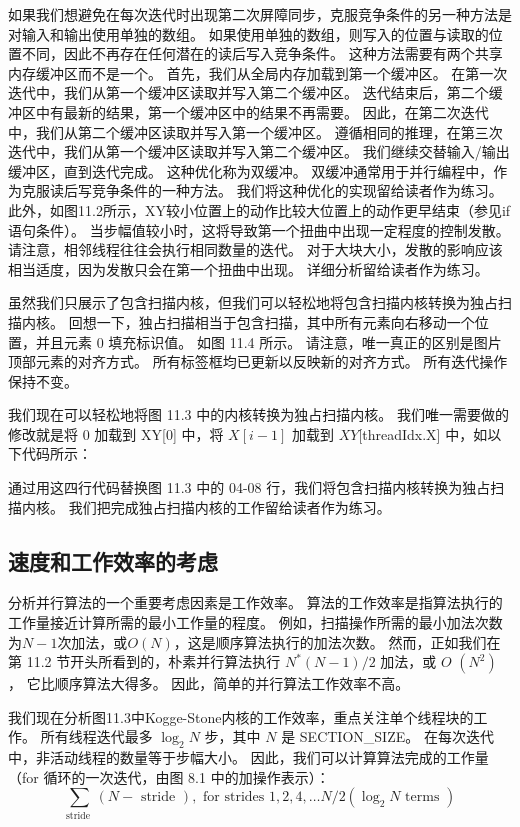 如果我们想避免在每次迭代时出现第二次屏障同步，克服竞争条件的另一种方法是对输入和输出使用单独的数组。 
如果使用单独的数组，则写入的位置与读取的位置不同，因此不再存在任何潜在的读后写入竞争条件。 
这种方法需要有两个共享内存缓冲区而不是一个。 首先，我们从全局内存加载到第一个缓冲区。 
在第一次迭代中，我们从第一个缓冲区读取并写入第二个缓冲区。 
迭代结束后，第二个缓冲区中有最新的结果，第一个缓冲区中的结果不再需要。 
因此，在第二次迭代中，我们从第二个缓冲区读取并写入第一个缓冲区。 
遵循相同的推理，在第三次迭代中，我们从第一个缓冲区读取并写入第二个缓冲区。 我们继续交替输入/输出缓冲区，直到迭代完成。 
这种优化称为双缓冲。 双缓冲通常用于并行编程中，作为克服读后写竞争条件的一种方法。 我们将这种优化的实现留给读者作为练习。 
此外，如图11.2所示，$\mathrm{XY}$较小位置上的动作比较大位置上的动作更早结束（参见if语句条件）。 
当步幅值较小时，这将导致第一个扭曲中出现一定程度的控制发散。 请注意，相邻线程往往会执行相同数量的迭代。 
对于大块大小，发散的影响应该相当适度，因为发散只会在第一个扭曲中出现。 详细分析留给读者作为练习。

虽然我们只展示了包含扫描内核，但我们可以轻松地将包含扫描内核转换为独占扫描内核。 
回想一下，独占扫描相当于包含扫描，其中所有元素向右移动一个位置，并且元素 0 填充标识值。 如图 11.4 所示。 
请注意，唯一真正的区别是图片顶部元素的对齐方式。 所有标签框均已更新以反映新的对齐方式。 所有迭代操作保持不变。

我们现在可以轻松地将图 11.3 中的内核转换为独占扫描内核。 
我们唯一需要做的修改就是将 0 加载到 XY[0] 中，将 $X[i-1]$ 加载到 $XY[$threadIdx.X] 中，如以下代码所示：

通过用这四行代码替换图 11.3 中的 04-08 行，我们将包含扫描内核转换为独占扫描内核。 
我们把完成独占扫描内核的工作留给读者作为练习。

\subsection{速度和工作效率的考虑}
分析并行算法的一个重要考虑因素是工作效率。 算法的工作效率是指算法执行的工作量接近计算所需的最小工作量的程度。 
例如，扫描操作所需的最小加法次数为$N-1$次加法，或$O(N)$，这是顺序算法执行的加法次数。 
然而，正如我们在第 11.2 节开头所看到的，朴素并行算法执行 $N^{*}(N-1) / 2$ 加法，或 $O$ $\left(N^{2}\right)$ ，
它比顺序算法大得多。 因此，简单的并行算法工作效率不高。

我们现在分析图11.3中Kogge-Stone内核的工作效率，重点关注单个线程块的工作。 
所有线程迭代最多 $\log _{2} N$ 步，其中 $N$ 是 SECTION\_SIZE。 在每次迭代中，非活动线程的数量等于步幅大小。 
因此，我们可以计算算法完成的工作量（for 循环的一次迭代，由图 8.1 中的加操作表示）：
$$
\sum_{\text {stride }}(N-\text { stride }), \text { for strides } 1,2,4, \ldots N / 2\left(\log_{2} N \text { terms }\right)
$$

